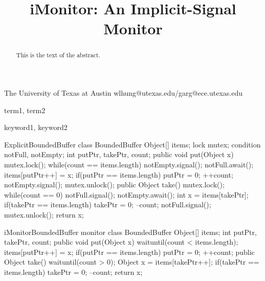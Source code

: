 \documentclass[preprint]{sigplanconf}
\begin{document}
\copyrightdata{[to be supplied]} 


\title{iMonitor: An Implicit-Signal Monitor}
\subtitle{}

           {The University of Texas at Austin}
           {wlhung@utexas.edu/garg@ece.utexas.edu}

\maketitle

\begin{abstract}
This is the text of the abstract.
\end{abstract}


\terms
term1, term2

\keywords
keyword1, keyword2

\begin{SaveVerbatim}{ExplicitBoundedBuffer}
class BoundedBuffer {
  Object[] items;  
  lock mutex;
  condition notFull, notEmpty;
  int putPtr, takePtr, count;
  public void put(Object x) {
    mutex.lock();
    while(count == items.length) {
      notEmpty.signal();
      notFull.await();
    }
    items[putPtr++] = x;
    if(putPtr == items.length) {
      putPtr = 0;
    }
    ++count;
    notEmpty.signal();
    mutex.unlock();
  }
  public Object take() {
    mutex.lock();
    while(count == 0) {
      notFull.signal();
      notEmpty.await();
    }
    int x = items[takePtr];
    if(takePtr == items.length) {
      takePtr = 0;
    }
    --count;
    notFull.signal();
    mutex.unlock();
    return x;
  }
}
\end{SaveVerbatim}

\begin{SaveVerbatim}{iMonitorBoundedBuffer}
monitor class BoundedBuffer { 
  Object[] items; 
  int putPtr, takePtr, count; 
  public void put(Object x) { 
    waituntil(count < items.length); 
    items[putPtr++] = x; 
    if(putPtr == items.length) { 
      putPtr = 0; 
    } 
    ++count; 
  } 
  public Object take() { 
    waituntil(count > 0); 
    Object x = items[takePtr++]; 
    if(takePtr == items.length) { 
      takePtr = 0; 
    }
    --count;
    return x;
  }
}
\end{SaveVerbatim}
\end{document}
